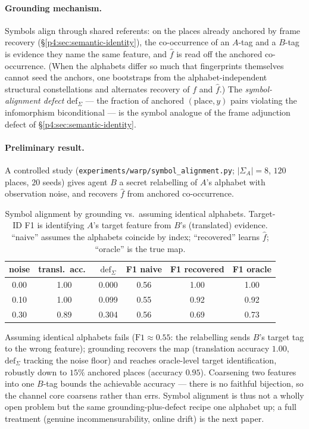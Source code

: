 \documentclass{article}
\newcommand{\method}[1]{\texttt{#1}}
\begin{document}
\paragraph{Grounding mechanism.} Symbols align through shared referents: on the
places already anchored by frame recovery (\S\ref{p4:sec:semantic-identity}), the
co-occurrence of an $A$-tag and a $B$-tag is evidence they name the same
feature, and $\hat f$ is read off the anchored co-occurrence. (When the
alphabets differ so much that fingerprints themselves cannot seed the anchors,
one bootstraps from the alphabet-independent structural constellations and
alternates recovery of $f$ and $\hat f$.) The \emph{symbol-alignment defect}
$\mathrm{def}_\Sigma$ --- the fraction of anchored $(\text{place},y)$ pairs
violating the infomorphism biconditional --- is the symbol analogue of the
frame adjunction defect of \S\ref{p4:sec:semantic-identity}.

\paragraph{Preliminary result.} A controlled study
(\method{experiments/warp/symbol\_alignment.py}; $|\Sigma_A|{=}8$, $120$ places,
$20$ seeds) gives agent $B$ a secret relabelling of $A$'s alphabet with
observation noise, and recovers $\hat f$ from anchored co-occurrence.

\begin{table}[h]
\caption{Symbol alignment by grounding vs.\ assuming identical alphabets.
Target-ID F1 is identifying $A$'s target feature from $B$'s (translated)
evidence. ``naive'' assumes the alphabets coincide by index; ``recovered''
learns $\hat f$; ``oracle'' is the true map.}
\label{p4:tab:symbol-alignment}
\centering
\small
\begin{tabular}{c c c c c c}
\toprule
noise & transl.\ acc.\ & $\mathrm{def}_\Sigma$ & F1 naive & F1 recovered & F1 oracle \\
\midrule
0.00 & 1.00 & 0.000 & 0.56 & 1.00 & 1.00 \\
0.10 & 1.00 & 0.099 & 0.55 & 0.92 & 0.92 \\
0.30 & 0.89 & 0.304 & 0.56 & 0.69 & 0.73 \\
\bottomrule
\end{tabular}
\end{table}

Assuming identical alphabets fails ($\text{F1}\approx0.55$: the relabelling
sends $B$'s target tag to the wrong feature); grounding recovers the map
(translation accuracy $1.00$, $\mathrm{def}_\Sigma$ tracking the noise floor)
and reaches oracle-level target identification, robustly down to $15\%$
anchored places (accuracy $0.95$). Coarsening two features into one $B$-tag
bounds the achievable accuracy --- there is no faithful bijection, so the
channel core coarsens rather than errs. Symbol alignment is thus not a wholly
open problem but the same grounding-plus-defect recipe one alphabet up; a full
treatment (genuine incommensurability, online drift) is the next paper.
\end{document}
